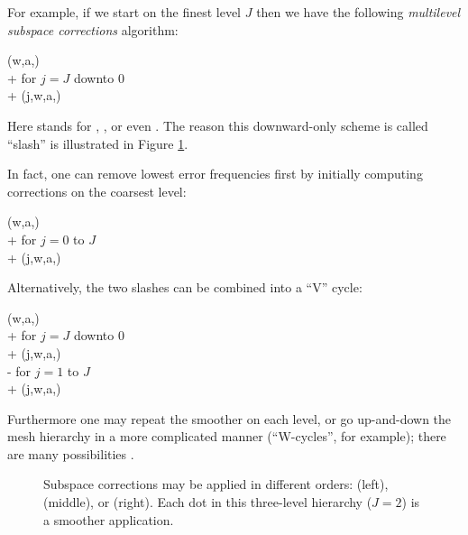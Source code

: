 \documentclass[letterpaper,final,12pt,reqno]{amsart}
\theoremstyle{claim}
\numberwithin{equation}{section}
\numberwithin{figure}{section}
\numberwithin{table}{section}
\numberwithin{theorem}{section}
\begin{document}
For example, if we start on the finest level $J$ then we have the following \emph{multilevel subspace corrections} \cite{Xu1992} algorithm:
\begin{pseudo*} \label{ps:msc-downslash}
(w,a,\ell)\text{:} \\+
    for $j=J$ downto $0$ \\+
        (j,w,a,\ell)
\end{pseudo*}
Here  stands for , , or even .  The reason this downward-only scheme is called ``slash'' is illustrated in Figure \ref{fig:msccycles}.

In fact, one can remove lowest error frequencies first by initially computing corrections on the coarsest level:
\begin{pseudo*} \label{ps:msc-upslash}
(w,a,\ell)\text{:} \\+
    for $j=0$ to $J$ \\+
        (j,w,a,\ell)
\end{pseudo*}
Alternatively, the two slashes can be combined into a ``V'' cycle:
\begin{pseudo*} \label{ps:msc-vcycle}
(w,a,\ell)\text{:} \\+
    for $j=J$ downto $0$ \\+
        (j,w,a,\ell) \\-
    for $j=1$ to $J$ \\+
        (j,w,a,\ell)
\end{pseudo*}
Furthermore one may repeat the smoother on each level, or go up-and-down the mesh hierarchy in a more complicated manner (``W-cycles'', for example); there are many possibilities \cite{Briggsetal2000,Trottenbergetal2001}.

\begin{figure}

\caption{Subspace corrections may be applied in different orders:  (left),   (middle), or  (right).  Each dot in this three-level hierarchy ($J=2$) is a smoother application.}
\label{fig:msccycles}
\end{figure}
\end{document}
